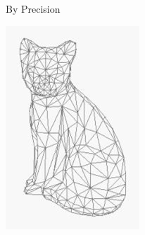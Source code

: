\begin{frame}{By Precision}
\begin{itemize}
\begin{itemize}
	\includegraphics[scale=0.12]{images/CADMesh.png}
	\end{itemize}
\end{itemize}
\end{frame}


